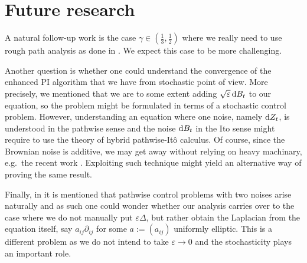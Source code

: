 \documentclass[./main.tex]{subfiles}
\begin{document}
\section{Future research}
A natural follow-up work is the case $\gamma\in (\frac 13,\frac 1 2)$ where we really need to use rough path analysis as done in \cite{Chakraborty_Honnappa_Tindel}. We expect this case to be more challenging. 

Another question is whether one could understand the convergence of the enhanced PI algorithm that we have from stochastic point of view. More precisely, we mentioned that we are to  some extent adding $\sqrt{\varepsilon}\,\mathrm{d} B_t$ to our equation, so the problem might be formulated in terms of a stochastic control problem. However, understanding an equation where one noise, namely $\mathrm{d} Z_t$, is understood in the pathwise sense and the noise $\mathrm{d} B_t$ in the Ito sense might require to use the theory of hybrid pathwise-Itô calculus. Of course, since the Brownian noise is additive, we may get away without relying on heavy machinary, e.g.\ the recent work \cite{Friz_Hocquet_Le}.  Exploiting such technique might yield an alternative way of proving the same result. 

Finally, in \cite{Friz_Hocquet_Le} it is mentioned that pathwise control problems with two noises arise naturally and as such one could wonder whether our analysis carries over to the case where we do not manually put $\varepsilon\Delta$, but rather obtain the Laplacian from the equation itself, say $a_{ij}\partial_{ij}$ for some $a:=(a_{ij})$ uniformly elliptic. This is a different problem as we do not intend to take $\varepsilon\to 0$ and the stochasticity plays an important role. 




 



\end{document}
